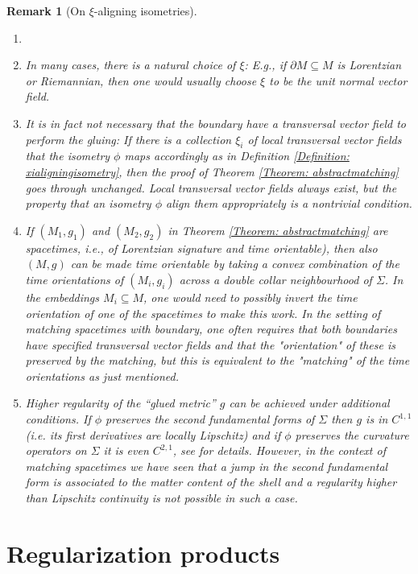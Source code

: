 \documentclass[11pt]{article}
\numberwithin{equation}{section}
\newtheorem{remark}[theorem]{Remark}
\begin{document}
\begin{remark}[On $\xi$-aligning isometries]
\begin{enumerate}
    \item[]
    \item[(i)] In many cases, there is a natural choice of $\xi$: E.g., if $\partial M \subseteq M$ is Lorentzian or Riemannian, then one would usually choose $\xi$ to be the unit normal vector field.
    \item[(ii)] It is in fact not necessary that the boundary have a transversal vector field to perform the gluing: If there is a collection $\xi_i$ of local transversal vector fields that the isometry $\phi$ maps accordingly as in Definition \ref{Definition: xialigningisometry}, then the proof of Theorem \ref{Theorem: abstractmatching} goes through unchanged. Local transversal vector fields always exist, but the property that an isometry $\phi$ align them appropriately is a nontrivial condition.
    \item[(iii)] If $(M_1,g_1)$ and $(M_2,g_2)$ in Theorem \ref{Theorem: abstractmatching} are spacetimes, i.e., of Lorentzian signature and time orientable), then also $(M,g)$ can be made time orientable by taking a convex combination of the time orientations of $(M_i,g_i)$ across a double collar neighbourhood of $\Sigma$. In the embeddings $M_i \subseteq M$, one would need to possibly invert the time orientation of one of the spacetimes to make this work. In the setting of matching spacetimes with boundary, one often requires that both boundaries have specified transversal vector fields and that the "orientation" of these is preserved by the matching, but this is equivalent to the "matching" of the time orientations as just mentioned. 
    \item[(iv)] Higher regularity of the ``glued metric'' $g$ can be achieved under additional conditions. If $\phi$ preserves the second fundamental forms of $\Sigma$ then $g$ is in $C^{1,1}$ (i.e. its first derivatives are locally Lipschitz) and if $\phi$ preserves the curvature operators on $\Sigma$ it is even $C^{2,1}$, see \cite[Lem.\ 5.1.1]{Spi:16} for details. However, in the context of matching spacetimes we have seen that a jump in the second fundamental form is associated to the matter content of the shell and a regularity higher than Lipschitz continuity is not possible in such a case.
\end{enumerate}
\end{remark}

\section{Regularization products}\label{app:distributional:identities}
\end{document}

